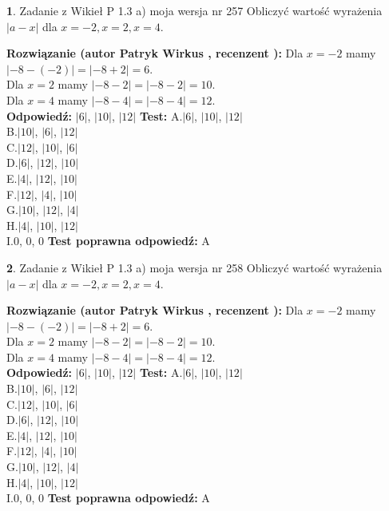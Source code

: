 \documentclass[12pt, a4paper]{article}
\theoremstyle{definition} %
\newtheorem{zad}{}
\newcommand{\zadStart}[1]{\begin{zad}#1\newline}
\newcommand{\zadStop}{\end{zad}}
\newcommand{\rozwStart}[2]{\noindent \textbf{Rozwiązanie (autor #1 , recenzent #2): }\newline}
\newcommand{\rozwStop}{\newline}
\newcommand{\odpStart}{\noindent \textbf{Odpowiedź:}\newline}
\newcommand{\odpStop}{\newline}
\newcommand{\testStart}{\noindent \textbf{Test:}\newline}
\newcommand{\testStop}{\newline}
\newcommand{\kluczStart}{\noindent \textbf{Test poprawna odpowiedź:}\newline}
\newcommand{\kluczStop}{\newline}
\begin{document}
\zadStart{Zadanie z Wikieł P 1.3 a) moja wersja nr 257}
Obliczyć wartość wyrażenia $|a - x|$ dla $x=-2,x=2,x=4$.
\zadStop
\rozwStart{Patryk Wirkus}{}
Dla $x = -2$ mamy $|-8 - (-2)| = |-8 + 2| = 6$.\\
Dla $x = 2$ mamy $|-8 - 2| = |-8 - 2| = 10$.\\
Dla $x = 4$ mamy $|-8 - 4| = |-8 - 4| = 12$.\\
\rozwStop
\odpStart
$|6|$, $|10|$, $|12|$
\odpStop
\testStart
A.$|6|$, $|10|$, $|12|$\\
B.$|10|$, $|6|$, $|12|$\\
C.$|12|$, $|10|$, $|6|$\\
D.$|6|$, $|12|$, $|10|$\\
E.$|4|$, $|12|$, $|10|$\\
F.$|12|$, $|4|$, $|10|$\\
G.$|10|$, $|12|$, $|4|$\\
H.$|4|$, $|10|$, $|12|$\\
I.$0$, $0$, $0$
\testStop
\kluczStart
A
\kluczStop



\zadStart{Zadanie z Wikieł P 1.3 a) moja wersja nr 258}
Obliczyć wartość wyrażenia $|a - x|$ dla $x=-2,x=2,x=4$.
\zadStop
\rozwStart{Patryk Wirkus}{}
Dla $x = -2$ mamy $|-8 - (-2)| = |-8 + 2| = 6$.\\
Dla $x = 2$ mamy $|-8 - 2| = |-8 - 2| = 10$.\\
Dla $x = 4$ mamy $|-8 - 4| = |-8 - 4| = 12$.\\
\rozwStop
\odpStart
$|6|$, $|10|$, $|12|$
\odpStop
\testStart
A.$|6|$, $|10|$, $|12|$\\
B.$|10|$, $|6|$, $|12|$\\
C.$|12|$, $|10|$, $|6|$\\
D.$|6|$, $|12|$, $|10|$\\
E.$|4|$, $|12|$, $|10|$\\
F.$|12|$, $|4|$, $|10|$\\
G.$|10|$, $|12|$, $|4|$\\
H.$|4|$, $|10|$, $|12|$\\
I.$0$, $0$, $0$
\testStop
\kluczStart
A
\kluczStop
\end{document}
